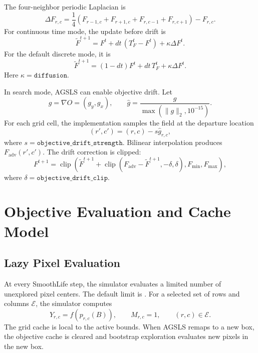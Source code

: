 \documentclass[11pt]{article}
\newcommand{\code}[1]{\texttt{\detokenize{#1}}}
\newcommand{\clip}{\operatorname{clip}}
\begin{document}
The four-neighbor periodic Laplacian is
\begin{equation}
\Delta F_{r,c}
=\frac{1}{4}\left(
F_{r-1,c}+F_{r+1,c}+F_{r,c-1}+F_{r,c+1}
\right)-F_{r,c}.
\label{eq:laplacian}
\end{equation}
For continuous time mode, the update before drift is
\begin{equation}
\tilde F^{t+1}
= F^t + dt\,(T_F^t-F^t)+\kappa\Delta F^t.
\label{eq:continuous-update}
\end{equation}
For the default discrete mode, it is
\begin{equation}
\tilde F^{t+1}
=(1-dt)F^t+dt\,T_F^t+\kappa\Delta F^t.
\label{eq:discrete-update}
\end{equation}
Here $\kappa=\texttt{diffusion}$.

In search mode, AGSLS can enable objective drift. Let
\begin{equation}
g = \nabla O = (g_y,g_x),
\qquad
\hat g = \frac{g}{\max(\|g\|_2,10^{-15})}.
\label{eq:support-gradient}
\end{equation}
For each grid cell, the implementation samples the field at the departure
location
\begin{equation}
(r',c')=(r,c)-s\hat g_{r,c},
\label{eq:departure-point}
\end{equation}
where $s=\texttt{objective\_drift\_strength}$. Bilinear interpolation produces
$F_{\mathrm{adv}}(r',c')$. The drift correction is clipped:
\begin{equation}
F^{t+1}
= \clip\left(\tilde F^{t+1}
+ \clip(F_{\mathrm{adv}}-\tilde F^{t+1},-\delta,\delta),
F_{\min},F_{\max}\right),
\label{eq:drift}
\end{equation}
where $\delta=\texttt{objective\_drift\_clip}$.

\section{Objective Evaluation and Cache Model}

\subsection{Lazy Pixel Evaluation}

At every SmoothLife step, the simulator evaluates a limited number of
unexplored pixel centers. The default limit is
\code{evaluations_per_step = 16}. For a selected set of rows and columns
$\mathcal{E}$, the simulator computes
\begin{equation}
Y_{r,c} = f(p_{r,c}(B)),
\qquad
M_{r,c}=1,
\qquad
(r,c)\in\mathcal{E}.
\label{eq:pixel-evaluation}
\end{equation}
The grid cache is local to the active bounds. When AGSLS remaps to a new
box, the objective cache is cleared and bootstrap exploration evaluates new
pixels in the new box.
\end{document}
